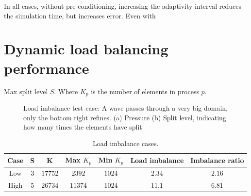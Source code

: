 In all cases, without pre-conditioning, increasing the adaptivity interval reduces the simulation
time, but increases error. Even with 

\section{Dynamic load balancing performance} \label{section:results:load_balancing_performance}

Max split level $S$. Where $K_p$ is the number of elements in process $p$.

\begin{figure}[H]
	\centering
	\hfill
	\caption{Load imbalance test case: A wave passes through a very big domain, only the bottom right refines. (a) Pressure (b) Split level, indicating how many times the elements have split}
	\label{fig:load_imbalance_case}
\end{figure}

\begin{table}[H]
	\centering
	\begin{tabular}{ c c c c c c c }
		Case & S & K & Max $K_p$ & Min $K_p$ & Load imbalance & Imbalance ratio \\
		\hline
		Low & $3$ & $17752$ & $2392$ & $1024$ & $2.34$ & $2.16$ \\
		High & $5$ & $26734$ & $11374$ & $1024$ & $11.1$ & $6.81$ \\
	\end{tabular}
	\caption{Load imbalance cases.}
	\label{table:load_imbalance}
\end{table}

